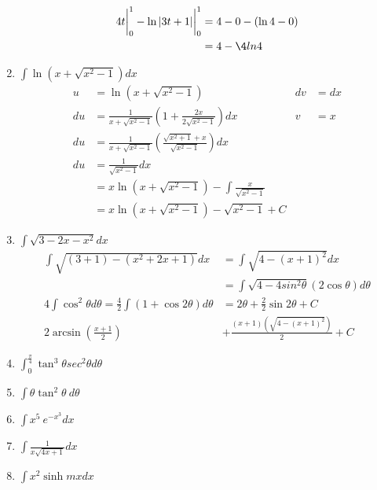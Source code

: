 \documentclass[12pt]{article}
\begin{document}
\begin{enumerate}
\begin{align*}
            4t\bigg|_0^1-\ln|3t+1|\bigg|_0^1 &= 4-0 - (\ln4 - 0) \\
            &= 4 - \4ln4
         \end{align*}
    \addtocounter{enumi}{3}\item $\int\ln\left(x+\sqrt{x^2-1}\right)dx$
        \begin{align*}
            u&= \ln{(x+\sqrt{x^2-1})} & dv &= dx \\
            du&= \frac{1}{x+\sqrt{x^2-1}}\left(1+\frac{2x}{2\sqrt{x^2-1}}\right)dx & v &= x\\
            du&=\frac{1}{x+\sqrt{x^2-1}}\left(\frac{\sqrt{x^2+1}+x}{\sqrt{x^2-1}}\right)dx\\
            du&= \frac{1}{\sqrt{x^2-1}}dx\\
            &=x\ln{(x+\sqrt{x^2-1})}-\int\frac{x}{\sqrt{x^2-1}}\\
            &=x\ln{(x+\sqrt{x^2-1})}-\sqrt{x^2-1} + C
        \end{align*}
    \addtocounter{enumi}{3}\item $\int\sqrt{3-2x-x^2}dx$
        \begin{align*}
            \int\sqrt{(3+1)-(x^2+2x+1)}dx &= \int\sqrt{4-(x+1)^2}dx \\
            &= \int\sqrt{4-4sin^2\theta}(2\cos\theta) d\theta\\
            4\int\cos^2\theta d\theta = \frac{4}{2}\int(1+\cos2\theta)d\theta &= 2\theta + \frac{2}{2}\sin{2\theta}+C\\
            2\arcsin{\left(\frac{x+1}{2}\right)}&+\frac{(x+1)(\sqrt{4-(x+1)^2})}{2} + C
        \end{align*}
    \addtocounter{enumi}{3}\item $\int^\frac{\pi}{4}_0\tan^3\theta sec^2\theta d\theta$
    \addtocounter{enumi}{3}\item $\int\theta \tan^2\theta \ d\theta$
    \addtocounter{enumi}{3}\item $\int x^5 \ e^{-x^3}dx$
    \addtocounter{enumi}{3}\item $\int\frac{1}{x\sqrt{4x+1}}dx$
    \addtocounter{enumi}{3}\item $\int x^2\sinh{mx}dx$
        
\end{enumerate}

 

 
 
\end{document}
